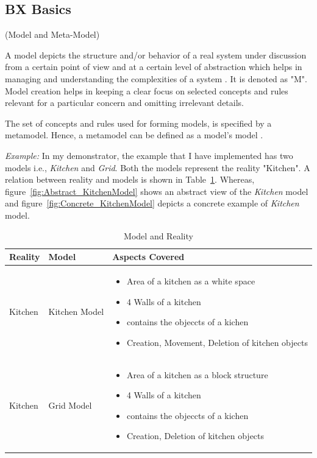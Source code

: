 \subsection{BX Basics}\label{subsec:definitions}

\begin{defn}\label{defModel} (Model and Meta-Model) \end{defn} 
A model depicts the structure and/or behavior of a real system under discussion from a certain point of view and at a certain level of abstraction which helps in managing and understanding the complexities of a system \cite{uml} \cite{mdsd}. It is denoted as "M". Model creation helps in keeping a clear focus on selected concepts and rules relevant for a particular concern and omitting irrelevant details.

The set of concepts and rules used for forming models, is specified by a metamodel. Hence, a metamodel can be defined as a model's model \cite{mdsd}. 

\textit{Example:} In my demonstrator, the example that I have implemented has two models i.e., \textit{Kitchen} and \textit{Grid}. Both the models represent the reality "Kitchen". A relation between reality and models is shown in Table~\ref{tab:Model_Reality}. Whereas, figure~\ref{fig:Abstract_KitchenModel} shows an abstract view of the \textit{Kitchen} model and figure~\ref{fig:Concrete_KitchenModel} depicts a concrete example of \textit{Kitchen} model.\\

\begin{table}
	\centering	
	\begin{tabular}{|p{3cm}|p{3cm}|p{9cm}|}
		\hline
		\rowcolor[gray]{.8}	
		\textbf{Reality} & \textbf{Model} & \textbf{Aspects Covered} \\
		\hline
		Kitchen & Kitchen Model & 
		\begin{itemize}
			\item Area of a kitchen as a white space
			\item 4 Walls of a kitchen
			\item contains the objeccts of a kichen
			\item Creation, Movement, Deletion of kitchen objects
		\end{itemize}\\
		\hline
		Kitchen & Grid Model & 
		\begin{itemize}
			\item Area of a kitchen as a block structure
			\item 4 Walls of a kitchen
			\item contains the objeccts of a kichen
			\item Creation, Deletion of kitchen objects
		\end{itemize}\\
		\hline					
		
	\end{tabular}
	\label{tab:Model_Reality}
	\caption{Model and Reality}
\end{table}

